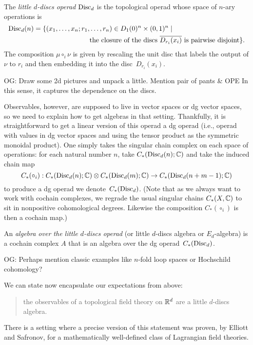 \documentclass[11pt]{amsart}
\def\owen#1{{\textcolor{violet!65!black}{OG: {#1}}}}
\begin{document}
\begin{dfn}
The {\em little $d$-discs operad} ${\rm Disc}_d$ is the topological operad whose space of $n$-ary operations is
\begin{align*}
{\rm Disc}_d(n) = \{ (x_1, \ldots, x_n; r_1, &\ldots, r_n)  \in D_1(0)^n \times (0,1)^n \;|\; \\
&\text{the closure of the discs $\overline{D_{r_i}(x_i)}$ is pairwise disjoint}\}.
\end{align*}
The composition $\mu \circ_i \nu$ is given by rescaling the unit disc that labels the output of $\nu$ to $r_i$ and then embedding it into the disc~$D_{r_i}(x_i)$.
\end{dfn}

\owen{Draw some 2d pictures and unpack a little. Mention pair of pants \& OPE} 
In this sense, it captures the dependence on the discs.


Observables, however, are supposed to live in vector spaces or dg vector spaces,
so we need to explain how to get algebras in that setting.
Thankfully, it is straightforward to get a linear version of this operad a dg operad (i.e., operad with values in dg vector spaces and using the tensor product as the symmetric monoidal product).
One simply takes the singular chain complex on each space of operations:
for each natural number $n$, take $C_*({\rm Disc}_d(n); \mathbb C)$ and take the induced chain map 
\[
C_*(\circ_i): C_*({\rm Disc}_d(n); \mathbb C) \otimes C_*({\rm Disc}_d(m); \mathbb C) \to C_*({\rm Disc}_d(n+m-1); \mathbb C)
\]
to produce a dg operad we denote~$C_*({\rm Disc}_d)$.
(Note that as we always want to work with cochain complexes, we regrade the usual singular chains $C_*(X, \mathbb C)$ to sit in nonpositive cohomological degrees. 
Likewise the composition $C_*(\circ_i)$ is then a cochain map.)

\begin{dfn}
An {\em algebra over the little $d$-discs operad} (or little $d$-discs algebra or $E_d$-algebra) is a cochain complex $A$ that is an algebra over the dg operad~$C_*({\rm Disc}_d)$.
\end{dfn}

\owen{Perhaps mention classic examples like $n$-fold loop spaces or Hochschild cohomology?}

We can state now encapsulate our expectations from above:
\begin{quote}
the observables of a topological field theory on $\mathbb R^d$ are a little $d$-discs algebra.
\end{quote}
There is a setting where a precise version of this statement was proven, by Elliott and Safronov, for a mathematically well-defined class of Lagrangian field theories.
\end{document}
